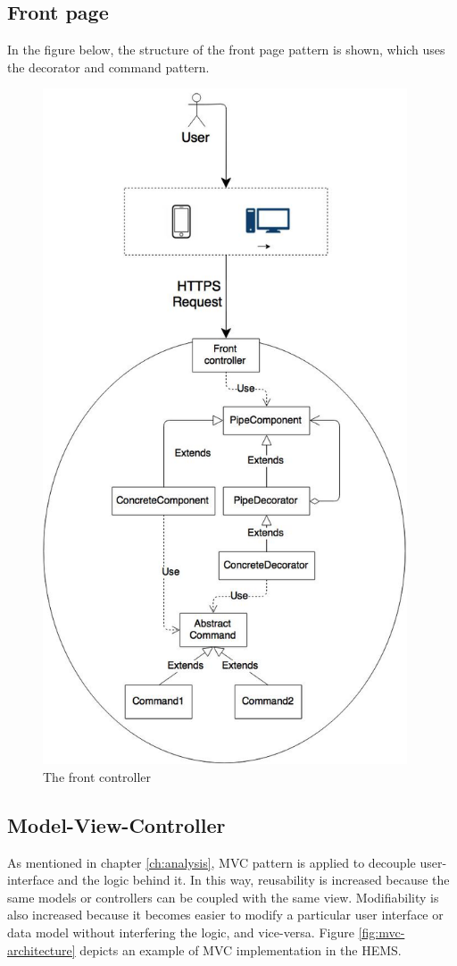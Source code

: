 \subsection{Front page}
In the figure below, the structure of the front page pattern is shown, which uses the decorator and command pattern.
\label{sec:unit-of-work-pattern}
\begin{figure}[H]
\centering
\includegraphics[scale=0.8, height=20cm]{7-software/images/frontPage.jpg}
\caption{The front controller}
\label{fig:frontcontroller}
\end{figure}

\clearpage
\subsection{Model-View-Controller}
\label{sec:mvc}
As mentioned in chapter \ref{ch:analysis}, MVC pattern is applied to decouple user-interface and the logic behind it. In this way, reusability is increased because the same models or controllers can be coupled with the same view. Modifiability is also increased because it becomes easier to modify a particular user interface or data model without interfering the logic, and vice-versa. Figure \ref{fig:mvc-architecture} depicts an example of MVC implementation in the HEMS.

